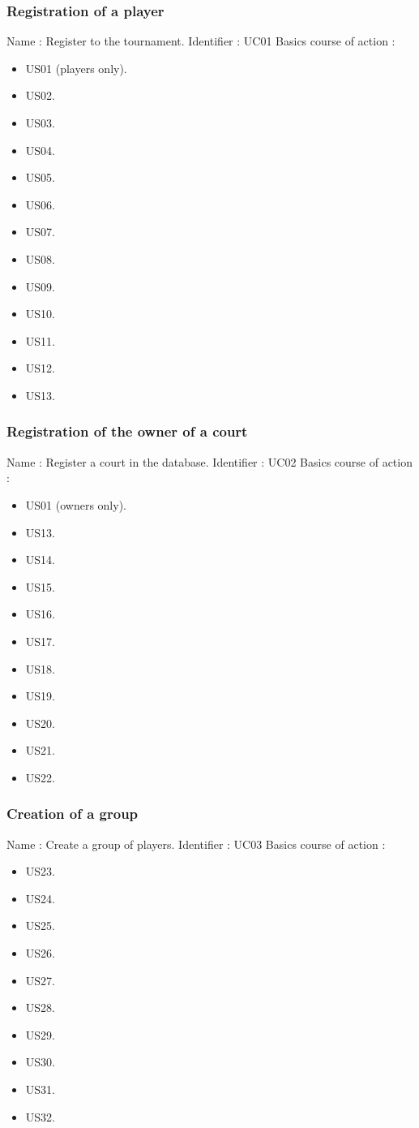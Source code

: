 \subsubsection{Registration of a player}

Name : Register to the tournament. \newline
Identifier : UC01 \newline
Basics course of action : \newline
\begin{itemize}
	\item US01 (players only).
	\item US02.
	\item US03.
	\item US04.
	\item US05.
	\item US06.
	\item US07.
	\item US08.
	\item US09.
	\item US10.
	\item US11.
	\item US12.
	\item US13.
\end{itemize}

\subsubsection{Registration of the owner of a court}

Name : Register a court in the database. \newline
Identifier : UC02 \newline
Basics course of action : \newline
\begin{itemize}
	\item US01 (owners only).
	\item US13.
	\item US14.
	\item US15.
	\item US16.
	\item US17.
	\item US18.
	\item US19.
	\item US20.
	\item US21.
	\item US22.
\end{itemize}


\subsubsection{Creation of a group}

Name : Create a group of players. \newline
Identifier : UC03 \newline
Basics course of action : \newline
\begin{itemize}
	\item US23.
	\item US24.
	\item US25.
	\item US26.
	\item US27.
	\item US28.
	\item US29.
	\item US30.
	\item US31.
	\item US32.
\end{itemize}
